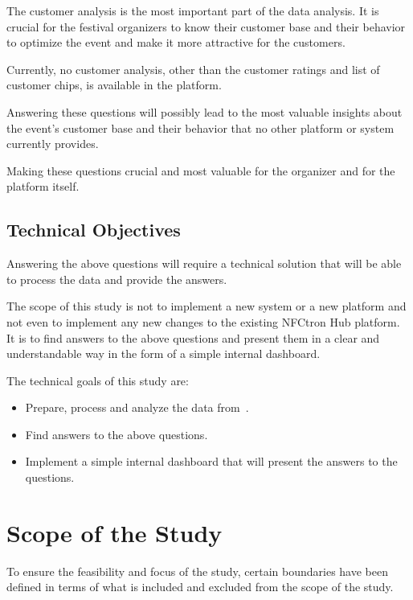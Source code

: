 The customer analysis is the most important part of the data analysis.
It is crucial for the festival organizers to know their customer base and their behavior to optimize the event and make it more attractive for the customers.

Currently, no customer analysis, other than the customer ratings and list of customer chips, is available in the platform.

Answering these questions will possibly lead to the most valuable insights about the event's customer base and their behavior that no other platform or system currently provides.

Making these questions crucial and most valuable for the organizer and for the platform itself.

\subsection*{Technical Objectives}
\label{subsec:introduction-objectives-technical}
Answering the above questions will require a technical solution that will be able to process the data and provide the answers.

The scope of this study is not to implement a new system or a new platform and not even to implement any new changes to the existing NFCtron Hub platform.
It is to find answers to the above questions and present them in a clear and understandable way in the form of a simple internal dashboard.

The technical goals of this study are:
\begin{itemize}
	\item Prepare, process and analyze the data from~\theEvent.
	\item Find answers to the above questions.
	\item Implement a simple internal dashboard that will present the answers to the questions.
\end{itemize}

\section*{Scope of the Study}
\label{sec:introduction-scope}
To ensure the feasibility and focus of the study, certain boundaries have been defined in terms of what is included and excluded from the scope of the study.

